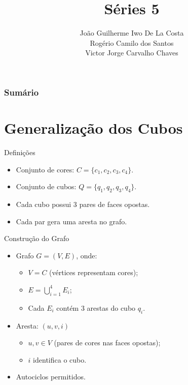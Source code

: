 \documentclass{beamer}
\title[Short Title]{Séries 5}
\author{João Guilherme Iwo De La Costa\\Rogério Camilo dos Santos\\Victor Jorge Carvalho Chaves}
\institute{Conexão dos Garfos}
\begin{document}
\frame{\titlepage}

\begin{frame}
\frametitle{Sumário}
\tableofcontents
\end{frame}

\section{Generalização dos Cubos}

\begin{frame}{Definições}
    \begin{itemize}
        \item Conjunto de cores: $C = \{c_1, c_2, c_3, c_4\}$.
        \item Conjunto de cubos: $Q = \{q_1, q_2, q_3, q_4\}$.
        \item Cada cubo possui 3 pares de faces opostas.
        \item Cada par gera uma aresta no grafo.
    \end{itemize}
\end{frame}

\begin{frame}{Construção do Grafo}
    \begin{itemize}
        \item Grafo $G = (V, E)$, onde:
        \begin{itemize}
            \item $V = C$ (vértices representam cores);
            \item $E = \bigcup_{i=1}^4 E_i$;
            \item Cada $E_i$ contém 3 arestas do cubo $q_i$.
        \end{itemize}
        \item Aresta: $(u, v, i)$
        \begin{itemize}
            \item $u, v \in V$ (pares de cores nas faces opostas);
            \item $i$ identifica o cubo.
        \end{itemize}
        \item Autociclos permitidos.
    \end{itemize}
\end{frame}
\end{document}
